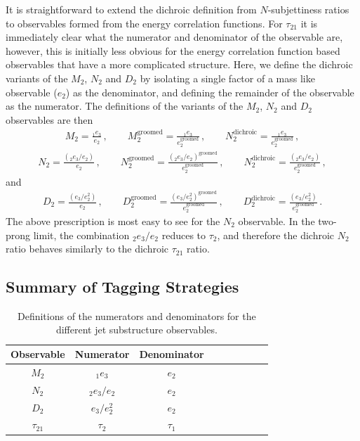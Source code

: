 \documentclass[11pt,letterpaper]{article}
\begin{document}
It is straightforward to extend the dichroic definition from $N$-subjettiness ratios to observables formed from the energy correlation functions.
%
For $\tau_{21}$ it is immediately clear what the numerator and denominator of the observable are, however, this is initially less obvious for the energy correlation function based observables that have a more complicated structure.
%
Here, we define the dichroic variants of the $M_2$, $N_2$ and $D_2$ by isolating a single factor of a mass like observable ($e_2$) as the denominator, and defining the remainder of the observable as the numerator.
%
The definitions of the variants of the $M_2$, $N_2$ and $D_2$ observables are then
\begin{align}
M_2= \frac{ _1e_{3}  }{e_{2}}\,, \qquad  M_2^{\text{groomed}}= \frac{ _1e_{3}  }{e_{2}^\text{groomed}}\,, \qquad  N_2^{\text{dichroic}}= \frac{_1e_{3}  }{e_{2}^\text{groomed}}\,, 
\end{align}
\begin{align}
N_2= \frac{\left( _2e_{3} / e_{2} \right) }{e_{2}}\,, \qquad  N_2^{\text{groomed}}= \frac{\left( _{2}e_{3} / e_{2} \right)^\text{groomed} }{e_{2}^\text{groomed}}\,, \qquad  N_2^{\text{dichroic}}= \frac{\left( _{2}e_{3} / e_{2} \right) }{e_{2}^\text{groomed}}\,, 
\end{align}
and
\begin{align}
D_2=\frac{\left( e_{3} / e_{2}^2 \right)}{ e_{2}}\,, \qquad D_2^{\text{groomed}}=\frac{\left( e_{3} / e_{2}^2 \right)^\text{groomed}}{ e_{2}^\text{groomed}}\,, \qquad D_2^{\text{dichroic}}=\frac{\left( e_{3} / e_{2}^2 \right)}{ e_{2}^\text{groomed}}\,.
\end{align}
The above prescription is most easy to see for the $N_2$ observable. In the two-prong limit, the combination $ _{2}e_{3} / e_{2} $ reduces to $\tau_2$, and therefore the dichroic $N_2$ ratio behaves similarly to the dichroic $\tau_{21}$ ratio.

\subsection{Summary of Tagging Strategies}\label{jetsub_2prong_sec:dichroic_sum}



\begin{table}
\begin{center}
\begin{tabular}{| c | c | c |c |c|c|c |c|r| }
  \hline                       
  Observable &  Numerator & Denominator \\
  \hline
  $M_2$ &   $_{1}e_{3}$ & $ e_{2}$ \\
  $N_2$ &   $_{2}e_{3} / e_{2} $ & $ e_{2}$ \\
  $D_2$ &   $e_{3} / e_{2}^2 $ & $ e_{2}$ \\
  $\tau_{21}$ &   $\tau_2$ & $\tau_1$ \\
  \hline  
\end{tabular}
\end{center}
\caption{
Definitions of the numerators and denominators for the different jet substructure observables.
}
\label{jetsub_2prong_tab:dn}
\end{table}
\end{document}
